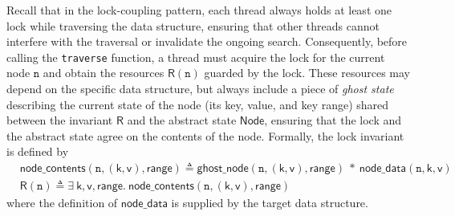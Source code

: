 \documentclass[a4paper,UKenglish,cleveref, autoref, thm-restate]{lipics-v2021}
\newcommand{\treerep}{\ensuremath{\mathsf{Node}}}
\begin{document}
Recall that in the lock-coupling pattern, each thread always holds at least one lock while traversing the data structure, ensuring that other threads cannot interfere with the traversal or invalidate the ongoing search. Consequently, before calling the \texttt{traverse} function, a thread must acquire the lock for the current node $\texttt{n}$ and obtain the resources $\mathsf{R}(\texttt{n})$ guarded by the lock. These resources may depend on the specific data structure, but always include a piece of \emph{ghost state} describing the current state of the node (its key, value, and key range) shared between the invariant $\mathsf{R}$ and the abstract state $\treerep$, ensuring that the lock and the abstract state agree on the contents of the node. Formally, the lock invariant is defined by 
\begin{align*}
	&\mathsf{node\_contents}(\texttt{n}, (\mathsf{k}, \mathsf{v}), \mathsf{range}) \triangleq \mathsf{ghost\_node(\texttt{n}, (\mathsf{k}, \mathsf{v}), range)} \ \ast \ \mathsf{node\_data}(\texttt{n}, \mathsf{k}, \mathsf{v})\\
	&\mathsf{R}(\texttt{n}) \triangleq \exists\ \mathsf{k}, \mathsf{v}, \mathsf{range}.\ \mathsf{node\_contents}(\texttt{n}, (\mathsf{k}, \mathsf{v}), \mathsf{range})\end{align*}
where the definition of $\mathsf{node\_data}$ is supplied by the target data structure.

\end{document}
